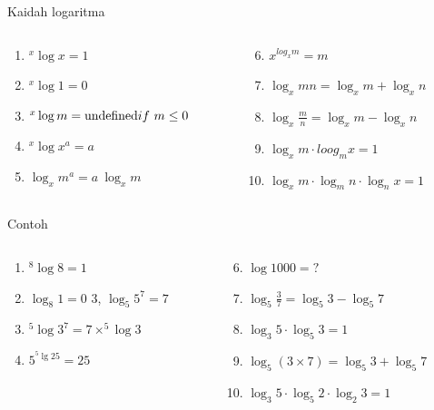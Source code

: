 \documentclass[
  ignorenonframetext,
]{beamer}
\providecommand{\tightlist}{%
  \setlength{\itemsep}{0pt}\setlength{\parskip}{0pt}}\usepackage{longtable,booktabs,array}
\begin{document}
\begin{frame}{Kaidah logaritma}
\label{kaidah-logaritma}
\begin{columns}[T]
\begin{column}{0.47\textwidth}
\begin{enumerate}
\tightlist
\item
  \(^x \log x = 1\)
\item
  \(^x \log 1 = 0\)
\item
  \(^x \log m = \text{undefined} \\ if\ m \le 0\)
\item
  \(^x \log x^a=a\)
\item
  \(\log_x m^a = a \ \log_x m\)
\end{enumerate}
\end{column}

\begin{column}{0.47\textwidth}
\begin{enumerate}
\setcounter{enumi}{5}
\tightlist
\item
  \(x^{log_x m}=m\)
\item
  \(\log_x mn = \log_x m + \log_x n\)
\item
  \(\log_x \frac{m}{n}=\log_x m-\log_x n\)
\item
  \(\log_x m \cdot loog_m x =1\)
\item
  \(\log_x m \cdot \log_m n \cdot \log_n x=1\)
\end{enumerate}
\end{column}
\end{columns}
\end{frame}

\begin{frame}{Contoh}
\label{contoh-2}
\begin{columns}[T]
\begin{column}{0.47\textwidth}
\begin{enumerate}
\tightlist
\item
  \(^8\log 8=1\)
\item
  \(\log_8 1=0\) 3, \(\log_5 5^7=7\)
\item
  \(^5\log 3^7=7 \times ^5\log 3\)
\item
  \(5^{^5\lg 25}=25\)
\end{enumerate}
\end{column}

\begin{column}{0.47\textwidth}
\begin{enumerate}
\setcounter{enumi}{5}
\tightlist
\item
  \(\log 1000 = ?\)
\item
  \(\log_5 \frac{3}{7}=\log_5 3-\log_5 7\)
\item
  \(\log_3 5 \cdot \log_5 3 =1\)
\item
  \(\log_5 (3\times 7)=\log_5 3 + \log_5 7\)
\item
  \(\log_3 5 \cdot \log_5 2 \cdot \log_2 3=1\)
\end{enumerate}
\end{column}
\end{columns}
\end{frame}
\end{document}
